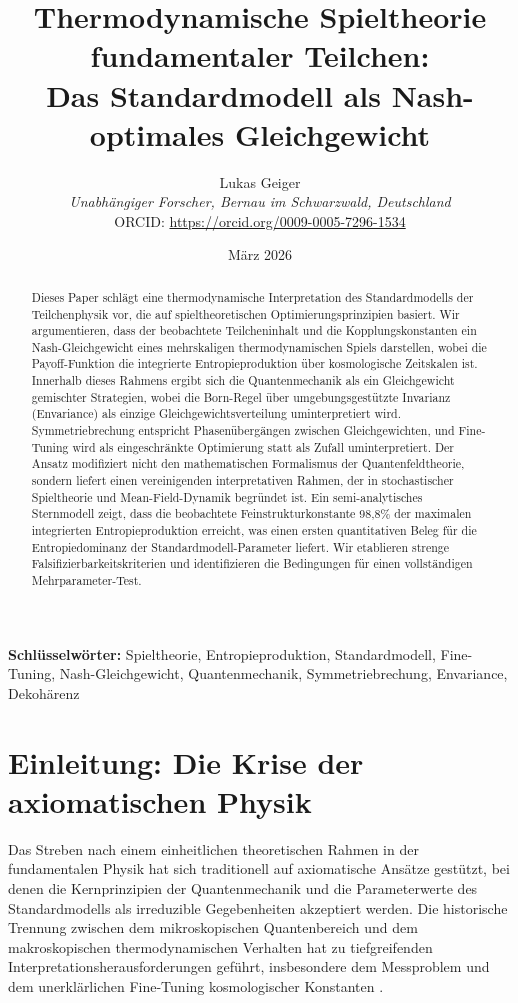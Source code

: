 \documentclass[12pt,a4paper]{article}
\title{Thermodynamische Spieltheorie fundamentaler Teilchen:\\
Das Standardmodell als Nash-optimales Gleichgewicht}
\author{Lukas Geiger\\
\textit{Unabh\"angiger Forscher, Bernau im Schwarzwald, Deutschland}\\
ORCID: \url{https://orcid.org/0009-0005-7296-1534}}
\date{M\"arz 2026}
\theoremstyle{remark}
\begin{document}
\maketitle

\begin{abstract}
Dieses Paper schl\"agt eine thermodynamische Interpretation des Standardmodells der Teilchenphysik vor, die auf spieltheoretischen Optimierungsprinzipien basiert. Wir argumentieren, dass der beobachtete Teilcheninhalt und die Kopplungskonstanten ein Nash-Gleichgewicht eines mehrskaligen thermodynamischen Spiels darstellen, wobei die Payoff-Funktion die integrierte Entropieproduktion \"uber kosmologische Zeitskalen ist. Innerhalb dieses Rahmens ergibt sich die Quantenmechanik als ein Gleichgewicht gemischter Strategien, wobei die Born-Regel \"uber umgebungsgest\"utzte Invarianz (Envariance) als einzige Gleichgewichtsverteilung uminterpretiert wird. Symmetriebrechung entspricht Phasen\"uberg\"angen zwischen Gleichgewichten, und Fine-Tuning wird als eingeschr\"ankte Optimierung statt als Zufall uminterpretiert. Der Ansatz modifiziert nicht den mathematischen Formalismus der Quantenfeldtheorie, sondern liefert einen vereinigenden interpretativen Rahmen, der in stochastischer Spieltheorie und Mean-Field-Dynamik begr\"undet ist. Ein semi-analytisches Sternmodell zeigt, dass die beobachtete Feinstrukturkonstante 98,8\% der maximalen integrierten Entropieproduktion erreicht, was einen ersten quantitativen Beleg f\"ur die Entropiedominanz der Standardmodell-Parameter liefert. Wir etablieren strenge Falsifizierbarkeits\-kriterien und identifizieren die Bedingungen f\"ur einen vollst\"andigen Mehrparameter-Test.
\end{abstract}

\textbf{Schl\"usselw\"orter:} Spieltheorie, Entropieproduktion, Standardmodell, Fine-Tuning, Nash-Gleichgewicht, Quantenmechanik, Symmetriebrechung, Envariance, Dekoh\"arenz

\section{Einleitung: Die Krise der axiomatischen Physik}
\label{sec:introduction}

Das Streben nach einem einheitlichen theoretischen Rahmen in der fundamentalen Physik hat sich traditionell auf axiomatische Ans\"atze gest\"utzt, bei denen die Kernprinzipien der Quantenmechanik und die Parameterwerte des Standardmodells als irreduzible Gegebenheiten akzeptiert werden. Die historische Trennung zwischen dem mikroskopischen Quantenbereich und dem makroskopischen thermodynamischen Verhalten hat zu tiefgreifenden Interpretationsherausforderungen gef\"uhrt, insbesondere dem Messproblem und dem unerkl\"arlichen Fine-Tuning kosmologischer Konstanten \citep{Adams2019}.
\end{document}
